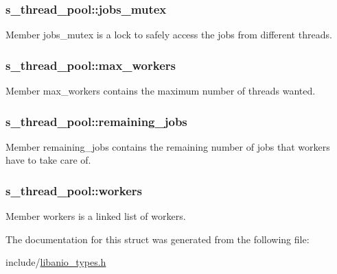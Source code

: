 \subsubsection[{jobs\+\_\+mutex}]{\setlength{\rightskip}{0pt plus 5cm}s\+\_\+thread\+\_\+pool\+::jobs\+\_\+mutex}\label{structs__thread__pool_a28c1be718ce196b7a79bbe7c815e90fe}
Member \textquotesingle{}jobs\+\_\+mutex\textquotesingle{} is a lock to safely access the jobs from different threads. \hypertarget{structs__thread__pool_a6514baa133ead32a26873fb71efb4fc3}{}
\subsubsection[{max\+\_\+workers}]{\setlength{\rightskip}{0pt plus 5cm}s\+\_\+thread\+\_\+pool\+::max\+\_\+workers}\label{structs__thread__pool_a6514baa133ead32a26873fb71efb4fc3}
Member \textquotesingle{}max\+\_\+workers\textquotesingle{} contains the maximum number of threads wanted. \hypertarget{structs__thread__pool_a770306a3ae1ad4b1fbc15666e2070474}{}
\subsubsection[{remaining\+\_\+jobs}]{\setlength{\rightskip}{0pt plus 5cm}s\+\_\+thread\+\_\+pool\+::remaining\+\_\+jobs}\label{structs__thread__pool_a770306a3ae1ad4b1fbc15666e2070474}
Member \textquotesingle{}remaining\+\_\+jobs\textquotesingle{} contains the remaining number of jobs that workers have to take care of. \hypertarget{structs__thread__pool_a499f3b150499f33aacbeeeee14cdcdbf}{}
\subsubsection[{workers}]{\setlength{\rightskip}{0pt plus 5cm}s\+\_\+thread\+\_\+pool\+::workers}\label{structs__thread__pool_a499f3b150499f33aacbeeeee14cdcdbf}
Member \textquotesingle{}workers\textquotesingle{} is a linked list of workers. 

The documentation for this struct was generated from the following file\+:\begin{DoxyCompactItemize}
\item 
include/\hyperlink{libanio__types_8h}{libanio\+\_\+types.\+h}\end{DoxyCompactItemize}
